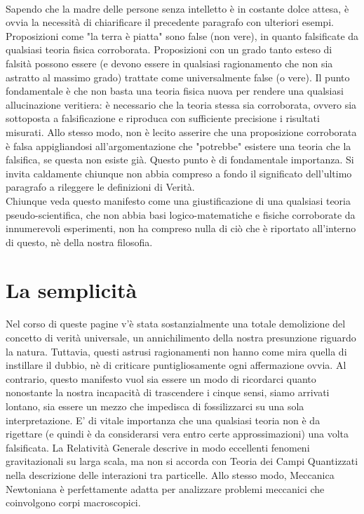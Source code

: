 \documentclass[]{scrbook}
\begin{document}
	\\
	Sapendo che la madre delle persone senza intelletto è in costante dolce attesa, è ovvia la necessità di chiarificare il precedente paragrafo con ulteriori esempi. Proposizioni come "la terra è piatta" sono false (non vere), in quanto falsificate da qualsiasi teoria fisica corroborata. Proposizioni con un grado tanto esteso di falsità possono essere (e devono essere in qualsiasi ragionamento che non sia astratto al massimo grado) trattate come universalmente false (o vere).
	Il punto fondamentale è che non basta una teoria fisica nuova per rendere una qualsiasi allucinazione veritiera: è necessario che la teoria stessa sia corroborata, ovvero sia sottoposta a falsificazione e riproduca con sufficiente precisione i risultati misurati. Allo stesso modo, non è lecito asserire che una proposizione corroborata è falsa appigliandosi all'argomentazione che "potrebbe" esistere una teoria che la falsifica, se questa non esiste già. Questo punto è di fondamentale importanza.		
	Si invita caldamente chiunque non abbia compreso a fondo il significato dell'ultimo paragrafo a rileggere le definizioni di Verità.\\
	Chiunque veda questo manifesto come una giustificazione di una qualsiasi teoria pseudo-scientifica, che non abbia basi logico-matematiche e fisiche corroborate da innumerevoli esperimenti, non ha compreso nulla di ciò che è riportato all'interno di questo, nè della nostra filosofia.
	\section{La semplicità}
	Nel corso di queste pagine v'è stata sostanzialmente una totale demolizione del concetto di verità universale, un annichilimento della nostra presunzione riguardo la natura. Tuttavia, questi astrusi ragionamenti non hanno come mira quella di instillare il dubbio, nè di criticare puntigliosamente ogni affermazione ovvia. Al contrario, questo manifesto vuol sia essere un modo di ricordarci quanto nonostante la nostra incapacità di trascendere i cinque sensi, siamo arrivati lontano, sia essere un mezzo che impedisca di fossilizzarci su una sola interpretazione. E' di vitale importanza che una qualsiasi teoria non è da rigettare (e quindi è da considerarsi vera entro certe approssimazioni) una volta falsificata. La Relatività Generale descrive in modo eccellenti fenomeni gravitazionali su larga scala, ma non si accorda con Teoria dei Campi Quantizzati nella descrizione delle interazioni tra particelle. Allo stesso modo, Meccanica Newtoniana è perfettamente adatta per analizzare problemi meccanici che coinvolgono corpi macroscopici. 
	
\end{document}

